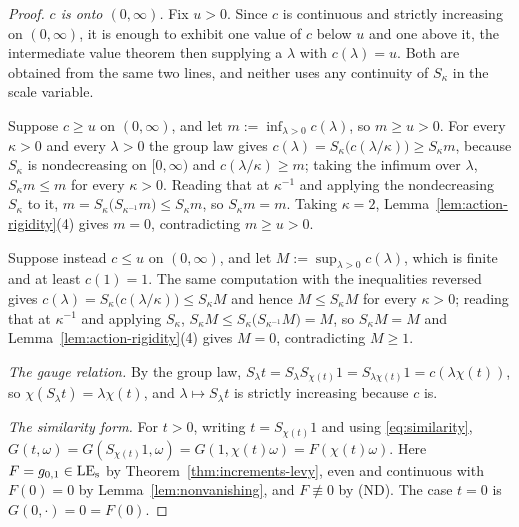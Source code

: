 \begin{proof}
\emph{$c$ is onto $(0,\infty)$.} Fix $u > 0$. Since $c$ is continuous and strictly increasing on
$(0,\infty)$, it is enough to exhibit one value of $c$ below $u$ and one above it, the
intermediate value theorem then supplying a $\lambda$ with $c(\lambda) = u$. Both are obtained
from the same two lines, and neither uses any continuity of $S_\kappa$ in the scale variable.

Suppose $c \ge u$ on $(0,\infty)$, and let $m := \inf_{\lambda > 0} c(\lambda)$, so
$m \ge u > 0$. For every $\kappa > 0$ and every $\lambda > 0$ the group law gives
$c(\lambda) = S_\kappa\bigl(c(\lambda/\kappa)\bigr) \ge S_\kappa m$, because $S_\kappa$ is
nondecreasing on $[0,\infty)$ and $c(\lambda/\kappa) \ge m$; taking the infimum over $\lambda$,
$S_\kappa m \le m$ for every $\kappa > 0$. Reading that at $\kappa^{-1}$ and applying the
nondecreasing $S_\kappa$ to it, $m = S_\kappa\bigl(S_{\kappa^{-1}}m\bigr) \le S_\kappa m$, so
$S_\kappa m = m$. Taking $\kappa = 2$, Lemma~\ref{lem:action-rigidity}(4) gives $m = 0$,
contradicting $m \ge u > 0$.

Suppose instead $c \le u$ on $(0,\infty)$, and let $M := \sup_{\lambda > 0} c(\lambda)$, which
is finite and at least $c(1) = 1$. The same computation with the inequalities reversed gives
$c(\lambda) = S_\kappa\bigl(c(\lambda/\kappa)\bigr) \le S_\kappa M$ and hence
$M \le S_\kappa M$ for every $\kappa > 0$; reading that at $\kappa^{-1}$ and applying $S_\kappa$,
$S_\kappa M \le S_\kappa\bigl(S_{\kappa^{-1}}M\bigr) = M$, so $S_\kappa M = M$ and
Lemma~\ref{lem:action-rigidity}(4) gives $M = 0$, contradicting $M \ge 1$.

\emph{The gauge relation.} By the group law,
$S_\lambda t = S_\lambda S_{\chi(t)}1 = S_{\lambda\chi(t)}1 = c(\lambda\chi(t))$, so
$\chi(S_\lambda t) = \lambda\chi(t)$, and $\lambda \mapsto S_\lambda t$ is strictly increasing
because $c$ is.

\emph{The similarity form.} For $t > 0$, writing $t = S_{\chi(t)}1$ and using
\ref{eq:similarity}, $G(t,\omega) = G(S_{\chi(t)}1,\omega) = G(1,\chi(t)\omega) =
F(\chi(t)\omega)$. Here $F = g_{0,1} \in \mathrm{LE}_{\mathrm{s}}$ by Theorem~\ref{thm:increments-levy}, even and
continuous with $F(0) = 0$ by Lemma~\ref{lem:nonvanishing}, and $F \not\equiv 0$ by (ND). The
case $t = 0$ is $G(0,\cdot) = 0 = F(0)$.
\end{proof}

